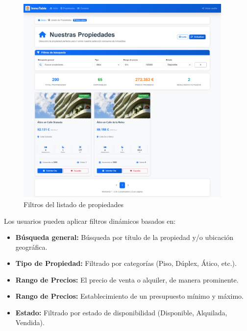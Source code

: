\begin{enumerate}
\begin{enumerate}
        \begin{figure}[H]
            \begin{center}
                \includegraphics[width = 0.95\textwidth]{Figuras/listadopropiedadesfiltro.png}
            \end{center}
            \caption{\label{fig:listadopropiedadesfiltro} Filtros del listado de propiedades}
        \end{figure}
        
        Los usuarios pueden aplicar filtros dinámicos basados en:
    
        \begin{itemize}
            \item \textbf{Búsqueda general:} Búsqueda por título de la propiedad y/o ubicación geográfica.
            
            \item \textbf{Tipo de Propiedad:} Filtrado por categorías (Piso, Dúplex, Ático, etc.).
            
            \item \textbf{Rango de Precios:} El precio de venta o alquiler, de manera prominente.
            
            \item \textbf{Rango de Precios:} Establecimiento de un presupuesto mínimo y máximo.
            
            \item \textbf{Estado:} Filtrado por estado de disponibilidad (Disponible, Alquilada, Vendida).
        \end{itemize}


\end{enumerate}
\end{enumerate}
